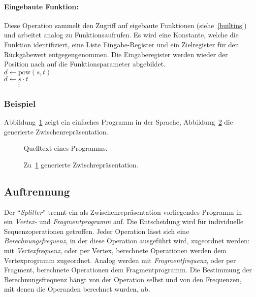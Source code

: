 \documentclass[twoside,a4paper,fleqn,12pt]{article}
\begin{document}
\paragraph{Eingebaute Funktion:} Diese Operation sammelt den Zugriff auf eigebaute Funktionen (siehe~\ref{builtins})
und arbeitet analog zu Funktionsaufrufen. Es wird eine Konstante, welche die Funktion identifiziert, eine Liste Eingabe-Register 
und ein Zielregister für den Rückgabewert entgegengenommen. Die Eingaberegister werden wieder der Position nach auf die Funktionsparameter abgebildet.
\\\hspace*{1cm}$d \gets \mathrm{pow}(s, t)$
\\\hspace*{1cm}$d \gets s \cdot t$
\\\hspace*{1cm}$\phantom{d \gets}\vdots$


\subsubsection{Beispiel}

Abbildung~\ref{fig:ir_sample_src} zeigt ein einfaches Programm in der Sprache, Abbildung~\ref{fig:ir_sample_gen} die generierte Zwischenrepräsentation.

\begin{figure}[h]
   \centering
  
  \caption{Quelltext eines Programms.}
  \label{fig:ir_sample_src}
\end{figure}
\begin{figure}[h]
   \centering
  
  \caption{Zu~\ref{fig:ir_sample_src} generierte Zwischrepräsentation.}
  \label{fig:ir_sample_gen}
\end{figure}

\subsection{Auftrennung}

Der "`\emph{Splitter}"' trennt ein als Zwischenrepräsentation vorliegendes Programm in ein \emph{Vertex-} und \emph{Fragmentprogramm} auf.
Die Entscheidung wird für individuelle Sequenzoperationen getroffen. Jeder Operation lässt sich eine \emph{Berechnungsfrequenz}, %
in der diese Operation ausgeführt wird, zugeordnet werden: mit \emph{Vertexfrequenz}, oder per Vertex, berechnete Operationen werden dem Vertexprogramm zugeordnet.
Analog werden mit \emph{Fragmentfrequenz}, oder per Fragment, berechnete Operationen dem Fragmentprogramm. Die Bestimmung der Berechnungsfrequenz hängt von der Operation selbst
und von den Frequenzen, mit denen die Operanden berechnet wurden, ab. 
\end{document}
